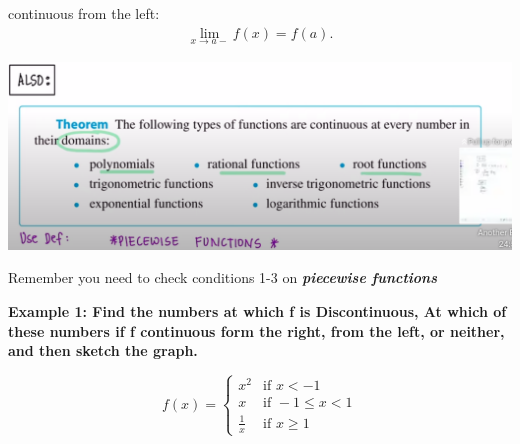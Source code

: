 \documentclass{report}
\begin{document}
        \bigbreak \noindent 
        continuous from the left:
        \begin{align*}
            \lim\limits_{x \to a-}{f \left(x\right) = f \left(a\right)}
        .\end{align*}
    
        \bigbreak \noindent \bigbreak \noindent 
        
        \bigbreak \noindent 
        \begin{center}
            \includegraphics[scale=0.4]{../images/9.png}
        \end{center}


        \bigbreak \noindent 
        Remember you need to check conditions 1-3 on \textbf{\textit{piecewise functions}}

        \pagebreak
        \begin{large}
            \noindent \textbf{Example 1: Find the numbers at which f is Discontinuous, At which of
                these numbers if f continuous form the right, from the left, or neither, and then
                sketch the graph.
            }
        \end{large}

        \bigbreak \noindent \bigbreak \noindent 
           \begin{equation}
            f \left(x\right)=
                \begin{cases}
                    x^2 & \text{if } x < -1  \\
                     x & \text{if } -1 \leq x < 1 \\
                     \frac{1}{x} & \text{if } x \geq 1 
                \end{cases}
            \end{equation}
\end{document}
